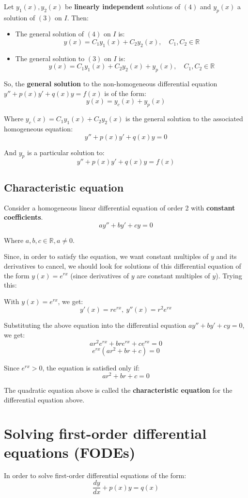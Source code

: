 \documentclass[11pt]{article}
\begin{document}
Let \(y_1(x), y_2(x)\) be \textbf{linearly independent} solutions of \((4)\) and \(y_p(x)\) a solution of \((3)\) on \(I\). Then:
\begin{itemize}
\item The general solution of \((4)\) on \(I\) is:
\[y(x) = C_1 y_1(x) + C_2 y_2(x), \quad C_1, C_2 \in \mathbb{R}\]
\item The general solution to \((3)\) on \(I\) is:
\[y(x) = C_1 y_1(x) + C_2 y_2(x) + y_p(x), \quad C_1, C_2 \in \mathbb{R}\]
\end{itemize}

So, the \textbf{general solution} to the non-homogeneous differential equation \(y'' + p(x)y' + q(x)y = f(x)\) is of the form:
\[y(x) = y_c(x) + y_p(x)\]

Where \(y_c(x) = C_1 y_1(x) + C_2 y_2(x)\) is the general solution to the associated homogeneous equation:
\[y'' + p(x)y' + q(x)y = 0\]

And \(y_p\) is a particular solution to:
\[y'' + p(x)y' + q(x)y = f(x)\]
\subsection{Characteristic equation}
\label{sec:org8ece60b}
Consider a homogeneous linear differential equation of order 2 with \textbf{constant coefficients}.
\[ay'' + by' + cy = 0\]

Where \(a, b, c \in \mathbb{R}, a \ne 0\).


Since, in order to satisfy the equation, we want constant multiples of \(y\) and its derivatives to cancel, we should look for solutions of this differential equation of the form \(y(x) = e^{rx}\) (since derivatives of \(y\) are constant multiples of \(y\)). Trying this:


With \(y(x) = e^{rx}\), we get:
\[y'(x) = re^{rx}, \ y''(x) = r^2 e^{rx}\]

Substituting the above equation into the differential equation \(ay'' + by' + cy = 0\), we get:
\[ar^2 e^{rx} + bre^{rx} + ce^{rx} = 0\]
\[e^{rx} (ar^2 + br + c) = 0\]

Since \(e^{rx} > 0\), the equation is satisfied only if:
\[ar^2 + br + c = 0\]

The quadratic equation above is called the \textbf{characteristic equation} for the differential equation above.

\newpage
\section{Solving first-order differential equations (FODEs)}
\label{sec:orgea8da41}
In order to solve first-order differential equations of the form:
\[\frac{dy}{dx} + p(x)y = q(x) \tag{1}\]
\end{document}
